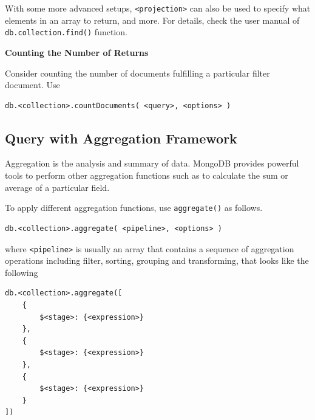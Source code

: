 With some more advanced setups, \verb|<projection>| can also be used to specify what elements in an array to return, and more. For details, check the user manual of \verb|db.collection.find()| function.

\vspace{0.1in}
\noindent \textbf{Counting the Number of Returns}
\vspace{0.1in}

Consider counting the number of documents fulfilling a particular filter document. Use
\begin{lstlisting}
db.<collection>.countDocuments( <query>, <options> )
\end{lstlisting}

\subsection{Query with Aggregation Framework}

Aggregation is the analysis and summary of data. MongoDB provides powerful tools to perform other aggregation functions such as to calculate the sum or average of a particular field.

To apply different aggregation functions, use \verb|aggregate()| as follows.
\begin{lstlisting}
db.<collection>.aggregate( <pipeline>, <options> )
\end{lstlisting}
where \verb|<pipeline>| is usually an array that contains a sequence of aggregation operations including filter, sorting, grouping and transforming, that looks like the following
\begin{lstlisting}
db.<collection>.aggregate([
	{
		$<stage>: {<expression>}
	},
	{
		$<stage>: {<expression>}
	},
	{
		$<stage>: {<expression>}
	}
])
\end{lstlisting}

